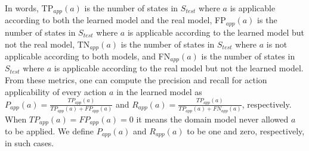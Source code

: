 \documentclass{article}
\theoremstyle{definition}
\theoremstyle{remark}
\newcommand{\stest}{\ensuremath{S_{\textit{test}}}\xspace}
\newcommand{\app}{\ensuremath{\textit{app}}\xspace}
\newif\ifaddcomments
\newcommand{\roni}[1]{\ifaddcomments{\textcolor{red}{[Roni: #1]}}\fi}
\newcommand{\argaman}[1]{\ifaddcomments{\textcolor{blue}{[Argaman: #1]}}\fi}
\newcommand{\pascalJr}[1]{\ifaddcomments{\textcolor{cyan}{[Pascal L.: {#1}]}}\fi}
\begin{document}
In words, TP$_{\app}(a)$ is the number of states in \stest where $a$ is applicable according to both the learned model and the real model, FP$_{\app}(a)$ is the number of states in $\stest$ where $a$ is applicable according to the learned model but not the real model, TN$_{\app}(a)$ is the number of states in $\stest$ where $a$ is not applicable according to both models, and FN$_{\app}(a)$ is the number of states in $\stest$ 
where $a$ is applicable according to the real model but not the learned model. 
From these metrics, one can compute the precision and recall 
for action applicability
of every action $a$ in the learned model as 
$P_{\app}(a)= \frac{TP_{\app}(a)}{TP_{\app}(a)+FP_{\app}(a)}$ 
and $R_{\app}(a)= \frac{TP_{\app}(a)}{TP_{\app}(a)+FN_{\app}(a)}$, 
respectively. 
When $TP_{\app}(a)=FP_{\app}(a)=0$ it means the domain model never allowed $a$ to be applied. We define $P_{\app}(a)$ and $R_{\app}(a)$ to be one and zero, respectively, in such cases. %






\end{document}
